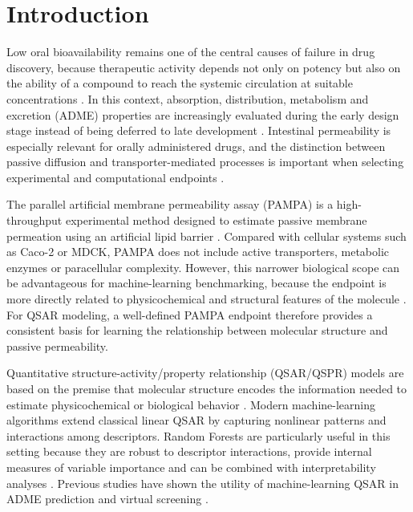 \documentclass[11pt]{article}
\begin{document}
\section{Introduction}
Low oral bioavailability remains one of the central causes of failure in drug discovery, because therapeutic activity depends not only on potency but also on the ability of a compound to reach the systemic circulation at suitable concentrations \cite{DiMasi2016,Kola2004}. In this context, absorption, distribution, metabolism and excretion (ADME) properties are increasingly evaluated during the early design stage instead of being deferred to late development \cite{Lipinski2001,Siramshetty2021}. Intestinal permeability is especially relevant for orally administered drugs, and the distinction between passive diffusion and transporter-mediated processes is important when selecting experimental and computational endpoints \cite{Lennernas2007,Jorgensen2025}.

The parallel artificial membrane permeability assay (PAMPA) is a high-throughput experimental method designed to estimate passive membrane permeation using an artificial lipid barrier \cite{Kansy1998,Sugano2001}. Compared with cellular systems such as Caco-2 or MDCK, PAMPA does not include active transporters, metabolic enzymes or paracellular complexity. However, this narrower biological scope can be advantageous for machine-learning benchmarking, because the endpoint is more directly related to physicochemical and structural features of the molecule \cite{Sun2017}. For QSAR modeling, a well-defined PAMPA endpoint therefore provides a consistent basis for learning the relationship between molecular structure and passive permeability.

Quantitative structure-activity/property relationship (QSAR/QSPR) models are based on the premise that molecular structure encodes the information needed to estimate physicochemical or biological behavior \cite{Todeschini2000}. Modern machine-learning algorithms extend classical linear QSAR by capturing nonlinear patterns and interactions among descriptors. Random Forests are particularly useful in this setting because they are robust to descriptor interactions, provide internal measures of variable importance and can be combined with interpretability analyses \cite{Breiman2001,Lundberg2017}. Previous studies have shown the utility of machine-learning QSAR in ADME prediction and virtual screening \cite{CastilloGarit2008,Sun2017,CasanolaMartin2018,Barigye2021,CanizaresCarmenate2022,Parasar2025}.
\end{document}
